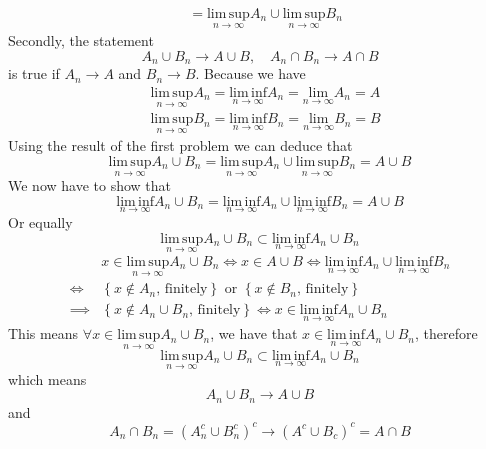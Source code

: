 \documentclass[a4paper,12pt]{article}
\begin{document}
\begin{list}{1.9.}{}
\[\begin{aligned}
      &= \underset{n\to\infty}{\mathrm{lim\,sup}} A_n \cup \underset{n\to\infty}{\mathrm{lim\,sup}} B_n
    \end{aligned}
  \]
  Secondly, the statement
  \[
    A_n\cup B_n \to A\cup B,\quad A_n\cap B_n \to A \cap B
  \]
  is true if $A_n\to A$ and $B_n \to B$. Because we have
  \[
    \begin{aligned}
      & \underset{n\to\infty}{\mathrm{lim\,sup}} A_n
      = \underset{n\to\infty}{\mathrm{lim\,inf}} A_n
      = \underset{n\to\infty}{\mathrm{lim}} A_n = A    \\
      & \underset{n\to\infty}{\mathrm{lim\,sup}} B_n
      = \underset{n\to\infty}{\mathrm{lim\,inf}} B_n
      = \underset{n\to\infty}{\mathrm{lim}} B_n = B
    \end{aligned}
  \]
  Using the result of the first problem we can deduce that
  \[
    \underset{n\to\infty}{\mathrm{lim\,sup}} A_n\cup B_n =
    \underset{n\to\infty}{\mathrm{lim\,sup}} A_n \cup \underset{n\to\infty}{\mathrm{lim\,sup}} B_n
    = A \cup B
  \]
  We now have to show that
  \[
    \underset{n\to\infty}{\mathrm{lim\,inf}} A_n \cup B_n =
    \underset{n\to\infty}{\mathrm{lim\,inf}} A_n \cup \underset{n\to\infty}{\mathrm{lim\,inf}} B_n
    = A \cup B
  \]
  Or equally
  \[
    \underset{n\to\infty}{\mathrm{lim\,sup}} A_n \cup B_n
    \subset
    \underset{n\to\infty}{\mathrm{lim\,inf}} A_n \cup B_n
  \]
  \[
    \begin{aligned}
      & x \in \underset{n\to\infty}{\mathrm{lim\,sup}} A_n \cup B_n
      \iff x \in A \cup B
      \iff \underset{n\to\infty}{\mathrm{lim\,inf}} A_n \cup \underset{n\to\infty}{\mathrm{lim\,inf}} B_n\\
      \iff&
      \left\{x \notin A_n\text{, finitely}\right\} \text{ or } \left\{x \notin B_n\text{, finitely}\right\}    \\
      \implies& \left\{ x \notin A_n \cup B_n \text{, finitely}\right\}
      \iff x \in \underset{n\to\infty}{\mathrm{lim\,inf}} A_n \cup B_n
    \end{aligned}
  \]
  This means $\forall x\in \underset{n\to\infty}{\mathrm{lim\,sup}} A_n \cup B_n$, we have that $x\in\underset{n\to\infty}{\mathrm{lim\,inf}} A_n \cup B_n$, therefore
  \[
    \underset{n\to\infty}{\mathrm{lim\,sup}} A_n \cup B_n
    \subset
    \underset{n\to\infty}{\mathrm{lim\,inf}} A_n \cup B_n
  \]
  which means
  \[
    A_n \cup B_n \to A \cup B
  \]
  and
  \[
    A_n \cap B_n = \left(A_n^c \cup B_n^c\right)^c \to \left(A^c \cup B_c\right)^c = A \cap B
  \]
\item \label{ex.1.9.4}

\end{list}
\end{document}
